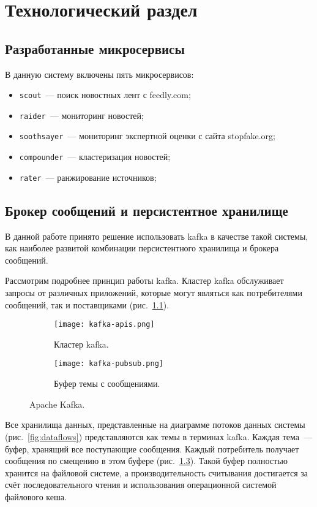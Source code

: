 \chapter{Технологический раздел}
\section{Разработанные микросервисы}
В данную систему включены пять микросервисов:
\begin{itemize}
    \item \verb|scout|~--- поиск новостных лент с feedly.com;
    \item \verb|raider|~--- мониторинг новостей;
    \item \verb|soothsayer|~--- мониторинг экспертной оценки с сайта stopfake.org;
    \item \verb|compounder|~--- кластеризация новостей;
    \item \verb|rater|~--- ранжирование источников;
\end{itemize}

\section{Брокер сообщений и персистентное хранилище}
В данной работе принято решение использовать kafka в качестве такой системы, как наиболее развитой комбинации персистентного хранилища и брокера сообщений.

Рассмотрим подробнее принцип работы kafka. Кластер kafka обслуживает запросы от различных приложений, которые могут являться как потребителями сообщений, так и поставщиками (рис.~\ref{fig:kafka-apis}).

\begin{figure}[h]
    \centering
    \begin{subfigure}{.5\textwidth}
        \centering
        \texttt{[image: kafka-apis.png]}
        \caption{Кластер kafka.}
        \label{fig:kafka-apis}
    \end{subfigure}%
    \begin{subfigure}{.5\textwidth}
        \centering
        \texttt{[image: kafka-pubsub.png]}
        \caption{Буфер темы с сообщениями.}
        \label{fig:kafka-pubsub}
    \end{subfigure}
    \caption{Apache Kafka.}
\end{figure}

Все хранилища данных, представленные на диаграмме потоков данных системы (рис.~\ref{fig:dataflows}) представляются как темы в терминах kafka. Каждая тема~--- буфер, хранящий все поступающие сообщения. Каждый потребитель получает сообщения по смещению в этом буфере (рис.~\ref{fig:kafka-pubsub}). Такой буфер полностью хранится на файловой системе, а производительность считывания достигается за счёт последовательного чтения и использования операционной системой файлового кеша.

